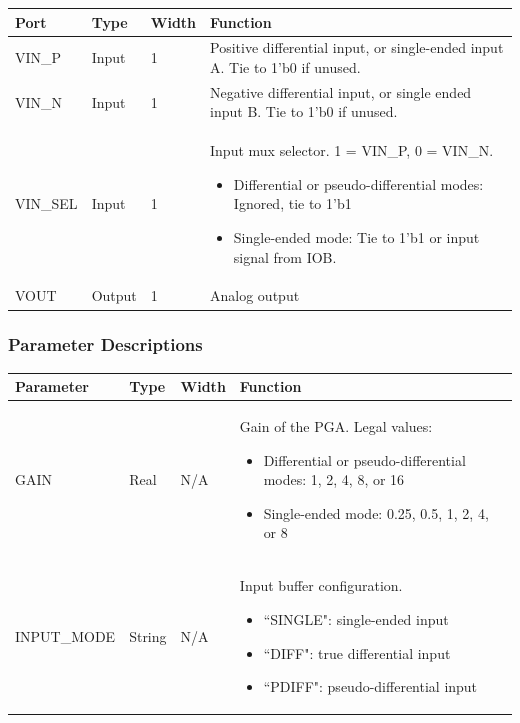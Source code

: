 \documentclass{article}
\begin{document}
\begin{tabularx}{5in}{|l|l|l|X|}
\hline
{\bfseries Port} & {\bfseries Type} & {\bfseries Width} & {\bfseries Function} \\
\hline
VIN\_P & Input & 1 & Positive differential input, or single-ended input A. Tie to 1'b0 if unused.\\
\hline
VIN\_N & Input & 1 & Negative differential input, or single ended input B. Tie to 1'b0 if unused.\\
\hline
VIN\_SEL & Input & 1 & Input mux selector. 1 = VIN\_P, 0 = VIN\_N.
	\begin{itemize}
		\item Differential or pseudo-differential modes: Ignored, tie to 1'b1
		\item Single-ended mode: Tie to 1'b1 or input signal from IOB.
	\end{itemize}\\
\hline
VOUT & Output & 1 & Analog output\\
\hline
\end{tabularx}

\subsubsection{Parameter Descriptions}

\begin{tabularx}{5in}{|l|l|l|X|}
\hline
{\bfseries Parameter} & {\bfseries Type} & {\bfseries Width} & {\bfseries Function} \\
\hline
GAIN & Real & N/A &
	Gain of the PGA. Legal values: 
	
	\begin{itemize}
		\item Differential or pseudo-differential modes: 1, 2, 4, 8, or 16
		\item Single-ended mode: 0.25, 0.5, 1, 2, 4, or 8
	\end{itemize}\\
	
\hline
INPUT\_MODE & String & N/A &
	Input buffer configuration.
	\begin{itemize}
		\item ``SINGLE": single-ended input
		\item ``DIFF": true differential input
		\item ``PDIFF": pseudo-differential input
	\end{itemize}\\
\hline
\end{tabularx}
\end{document}
